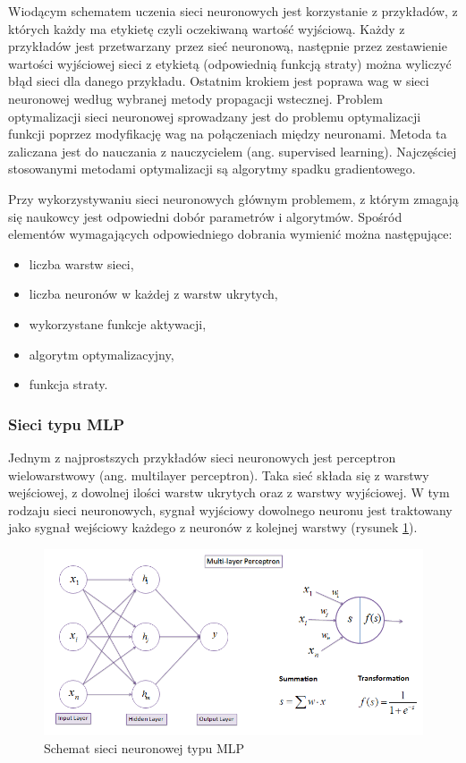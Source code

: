 \documentclass[a4paper, twoside, 11pt, openright]{article}
\begin{document}
\bigskip

Wiodącym schematem uczenia sieci neuronowych jest korzystanie z przykładów, z których każdy ma etykietę czyli oczekiwaną wartość wyjściową. Każdy z przykładów jest przetwarzany przez sieć neuronową, następnie przez zestawienie wartości wyjściowej sieci z etykietą (odpowiednią funkcją straty) można wyliczyć błąd sieci dla danego przykładu. Ostatnim krokiem jest poprawa wag w sieci neuronowej według wybranej metody propagacji wstecznej. Problem optymalizacji sieci neuronowej sprowadzany jest do problemu optymalizacji funkcji poprzez modyfikację wag na połączeniach między neuronami. Metoda ta zaliczana jest do nauczania z nauczycielem (ang. supervised learning). Najczęściej stosowanymi metodami optymalizacji są algorytmy spadku gradientowego. 

\bigskip

Przy wykorzystywaniu sieci neuronowych głównym problemem, z którym zmagają się naukowcy jest odpowiedni dobór parametrów i algorytmów. Spośród elementów wymagających odpowiedniego dobrania wymienić można następujące:
\begin{itemize}
\item liczba warstw sieci,
\item liczba neuronów w każdej z warstw ukrytych,
\item wykorzystane funkcje aktywacji,
\item algorytm optymalizacyjny,
\item funkcja straty.
\end{itemize}


\subsubsection{Sieci typu MLP \cite{mlp}}

Jednym z najprostszych przykładów sieci neuronowych jest perceptron wielowarstwowy (ang. multilayer perceptron). Taka sieć składa się z warstwy wejściowej, z dowolnej ilości warstw ukrytych oraz z warstwy wyjściowej. W tym rodzaju sieci neuronowych, sygnał wyjściowy dowolnego neuronu jest traktowany jako sygnał wejściowy każdego z neuronów z kolejnej warstwy (rysunek \ref{neural-net}). 

\bigskip

\begin{figure}[H]
\centering \includegraphics[scale=0.7]{img/nn.png}
\caption{Schemat sieci neuronowej typu MLP \cite{mlpnn}}
\label{neural-net}
\end{figure}
\end{document}
